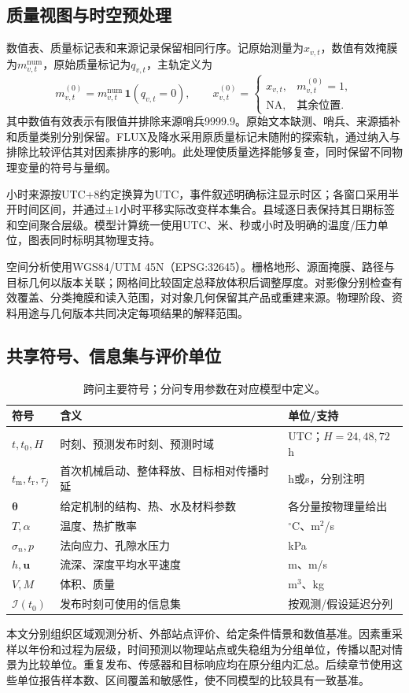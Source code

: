 \subsection{质量视图与时空预处理}
数值表、质量标记表和来源记录保留相同行序。记原始测量为$x_{v,t}$，数值有效掩膜为$m^{\mathrm{num}}_{v,t}$，原始质量标记为$q_{v,t}$，主轨定义为
\begin{equation}
 m^{(0)}_{v,t}=m^{\mathrm{num}}_{v,t}\,\mathbf 1(q_{v,t}=0),\qquad
 x^{(0)}_{v,t}=\begin{cases}x_{v,t},&m^{(0)}_{v,t}=1,\\ \mathrm{NA},&\text{其余位置}.\end{cases}
 \label{eq:common-qc}
\end{equation}
其中数值有效表示有限值并排除来源哨兵9999.9。原始文本缺测、哨兵、来源插补和质量类别分别保留。FLUX及降水采用原质量标记未随附的探索轨，通过纳入与排除比较评估其对因素排序的影响。此处理使质量选择能够复查，同时保留不同物理变量的符号与量纲。

小时来源按UTC+8约定换算为UTC，事件叙述明确标注显示时区；各窗口采用半开时间区间，并通过$\pm1$小时平移实际改变样本集合。县域逐日表保持其日期标签和空间聚合层级。模型计算统一使用UTC、米、秒或小时及明确的温度/压力单位，图表同时标明其物理支持。

空间分析使用WGS84/UTM 45N（EPSG:32645）。栅格地形、源面掩膜、路径与目标几何以版本关联；网格间比较固定总释放体积后调整厚度。对影像分别检查有效覆盖、分类掩膜和读入范围，对对象几何保留其产品或重建来源。物理阶段、资料用途与几何版本共同决定每项结果的解释范围。

\subsection{共享符号、信息集与评价单位}
\begin{table}[htbp]
\centering\small
\caption{跨问主要符号；分问专用参数在对应模型中定义。}\label{tab:common-symbols}
\begin{tabularx}{\linewidth}{p{2.0cm}Yp{2.6cm}}
\toprule
符号 & 含义 & 单位/支持\\
\midrule
$t,t_0,H$ & 时刻、预测发布时刻、预测时域 & UTC；$H=24,48,72$\,h\\
$t_{\mathrm m},t_{\mathrm r},\tau_j$ & 首次机械启动、整体释放、目标相对传播时延 & h或s，分别注明\\
$\boldsymbol\theta$ & 给定机制的结构、热、水及材料参数 & 各分量按物理量给出\\
$T,\alpha$ & 温度、热扩散率 & $^{\circ}$C、m$^2$/s\\
$\sigma_n,p$ & 法向应力、孔隙水压力 & kPa\\
$h,\boldsymbol u$ & 流深、深度平均水平速度 & m、m/s\\
$V,M$ & 体积、质量 & m$^3$、kg\\
$\mathcal I(t_0)$ & 发布时刻可使用的信息集 & 按观测/假设延迟分列\\
\bottomrule
\end{tabularx}
\end{table}

本文分别组织区域观测分析、外部站点评价、给定条件情景和数值基准。因素重采样以年份和过程为层级，时间预测以物理站点或失稳组为分组单位，传播以配对情景为比较单位。重复发布、传感器和目标响应均在原分组内汇总。后续章节使用这些单位报告样本数、区间覆盖和敏感性，使不同模型的比较具有一致基准。
\AIcredit
